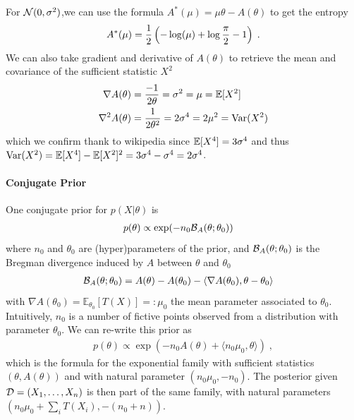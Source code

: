 \documentclass{article}
\newcommand*{\expect}[2][]{\ensuremath{\mathbb{E}_{#1} \left[ #2 \right] }} %
\newcommand{\logpart}{A}
\newcommand{\conj}{\logpart^*}
\newcommand{\bregman}{\cB_\logpart}
\newcommand{\nat}{\theta}
\newcommand{\meanp}{\mu}
\begin{document}
\begin{example}
For ${\mathcal N}(0,\sigma^2)$,we can use the formula $\conj(\mu) = \mu \nat - \logpart(\nat)$ to get the entropy
\begin{align}
	\conj(\mu) = \half\left( -\log(\mu) + \log\frac{\pi}{2} - 1 \right) \; .
\end{align}
We can also take gradient and derivative of $\logpart(\nat)$ to retrieve the mean and covariance of the sufficient statistic $X^2$
\begin{align}
	\nabla\logpart(\nat) &= \frac{-1}{2 \nat} = \sigma^2 = \mu = \E[X^2] \\
	\nabla^2\logpart(\nat) &= \frac{1}{2 \nat^2} = 2 \sigma^4 = 2 \mu^2 = \Var(X^2) 
\end{align}
which we confirm thank to wikipedia since $\operatorname{\mathbb{E}}[X^4] = 3 \sigma^4$ and thus $\operatorname{\mathrm{Var}}(X^2) = \operatorname{\mathbb{E}}[X^4] - \operatorname{\mathbb{E}}[X^2]^2 = 3 \sigma^4 - \sigma^4 = 2 \sigma^4$.
\end{example}

\paragraph{Conjugate Prior}
One conjugate prior for $p(X|\nat)$ is
\begin{align}
    p(\nat) &\propto \exp( - n_0 \bregman(\nat ; \nat_0) )
\end{align}
where $n_0$ and $\nat_0$ are (hyper)parameters of the prior, and $\bregman(\nat ; \nat_0)$ is the Bregman divergence induced by $\logpart$ between $\nat$ and $\nat_0$
\begin{align}
    \bregman (\nat ; \nat_0)
    & = \logpart(\nat) - \logpart(\nat_0) 
    - \langle \nabla \logpart(\nat_0)  , \nat - \nat_0 \rangle
\end{align}
with $\nabla \logpart(\nat_0) = \expect[\nat_0]{T(X)} =: \meanp_0$ the mean parameter associated to $\nat_0$. 
Intuitively, $n_0$ is a number of fictive points observed from a distribution with parameter $\nat_0$.
We can re-write this prior as 
\begin{align}
    p(\nat) \propto 
    \exp( -n_0 \logpart (\nat) 
    + \langle n_0 \mu_0, \nat \rangle ) \; ,
\end{align}
which is the formula for the exponential family with sufficient statistics $(\nat ,\logpart(\nat))$ and with natural parameter $(n_0 \mu_0, -n_0)$.
The posterior given ${\mathcal D}=(X_1,\dots, X_n)$ is then part of the same family, with natural parameters $(n_0 \mu_0 + \sum_i T(X_i) , -(n_0 + n))$.
\end{document}
